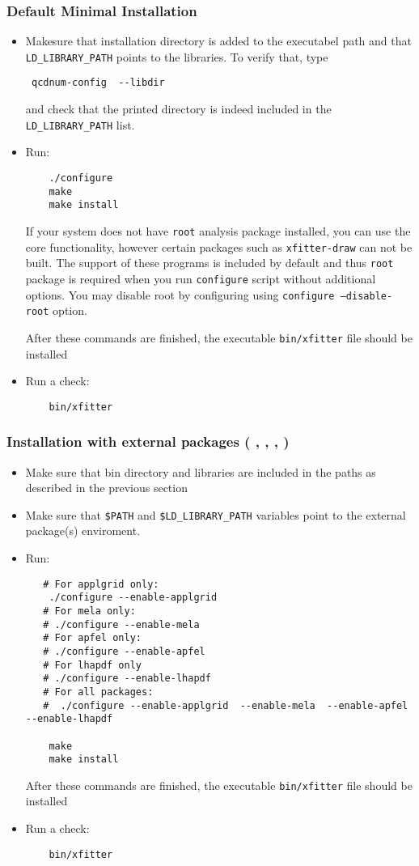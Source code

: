 \subsubsection{Default Minimal Installation}
\begin{itemize}
\item
 Makesure that \qcdnum installation directory is added to the executabel
 path and that {\tt LD\_LIBRARY\_PATH} points to the \qcdnum libraries.
 To verify that, type
\begin{verbatim}
 qcdnum-config  --libdir
\end{verbatim}
and check that the printed directory is indeed included in the {\tt LD\_LIBRARY\_PATH} list.

\item Run:
\begin{verbatim}
    ./configure
    make 
    make install
\end{verbatim}
If your system does not have {\tt root} analysis package installed, you can use the {\fitter} core functionality, however certain packages such as {\tt xfitter-draw} 
can not be built. The support of these programs is included by default and thus 
{\tt root} package is required when you run {\tt configure} script without 
additional options. You may disable root by configuring using 
{\tt configure --disable-root} option.


After these commands are finished, the executable {\tt bin/xfitter} 
file should be installed
\item  Run a check:
\begin{verbatim}
    bin/xfitter 
\end{verbatim}
\end{itemize}
\subsubsection{Installation with external packages
( \applgrid, \apfel, \mela, \lhapdf )}
\label{sec:installation}
\begin{itemize}
\item Make sure that \qcdnum bin directory and libraries are included
in the paths as described in the previous section
\item Make sure that {\tt \$PATH} and {\tt \$LD\_LIBRARY\_PATH} 
variables point to the external package(s) enviroment.
\item Run:
\begin{verbatim}
   # For applgrid only:
    ./configure --enable-applgrid 
   # For mela only:  
   # ./configure --enable-mela 
   # For apfel only:
   # ./configure --enable-apfel
   # For lhapdf only 
   # ./configure --enable-lhapdf
   # For all packages:
   #  ./configure --enable-applgrid  --enable-mela  --enable-apfel  --enable-lhapdf

    make 
    make install
\end{verbatim}
After these commands are finished, the executable {\tt bin/xfitter} 
file should be installed
\item  Run a check:
\begin{verbatim}
    bin/xfitter 
\end{verbatim}
\end{itemize}


